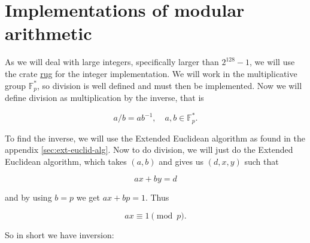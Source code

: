 \section{Implementations of modular arithmetic}

As we will deal with large integers, specifically larger than $2^{128}-1$, we will use the crate \href{https://docs.rs/rug/latest/rug/}{rug} for the integer implementation.
We will work in the multiplicative group $\mathbb{F}_p^*$, so division is well defined and must then be implemented.
Now we will define division as multiplication by the inverse, that is 

\begin{equation}
  a / b = ab^{-1}, \quad a, b \in \mathbb{F}_p^*.
  \label{eq:division}
\end{equation}

To find the inverse, we will use the Extended Euclidean algorithm as found in the appendix \ref{sec:ext-euclid-alg}.
Now to do division, we will just do the Extended Euclidean algorithm, which takes $(a, b)$ and gives us $(d, x, y)$ such that

\begin{equation}
  ax + by = d
  \label{eq:ext-euclid-alg}
\end{equation}

and by using $b = p$ we get $ax + bp = 1$. Thus

\begin{equation}
  ax \equiv 1 \pmod{p}.
\end{equation}

So in short we have inversion:

